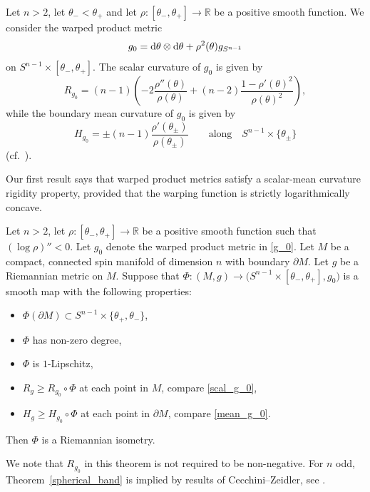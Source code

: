 \documentclass[pdftex]{sigma}
\numberwithin{equation}{section}
\newcommand{\R}{\mathbb{R}}
\begin{document}
Let $n>2$, let $\theta_- < \theta_+$ and let $\rho\colon [\theta_- , \theta_+] \to \R$ be a positive smooth function.
We consider the warped product metric
\begin{equation} \label{g_0}
 g_0 = {\rm d}\theta \otimes {\rm d}\theta + \rho^2(\theta) g_{S^{n-1}}
\end{equation}
on $S^{n-1} \times [\theta_- , \theta_+]$. The scalar curvature of $g_0$ is given by
\begin{equation} \label{scal_g_0}
 R_{g_0} = (n-1) \left( -2 \frac{\rho''(\theta)}{\rho(\theta)} + (n-2) \frac{1- \rho'(\theta)^2}{\rho(\theta)^2} \right),
\end{equation}
while the boundary mean curvature of $g_0$ is given by
\begin{equation} \label{mean_g_0}
 H_{g_0} = \pm (n-1) \frac{\rho'(\theta_{\pm})}{\rho(\theta_{\pm})}\qquad \text{along}\quad S^{n-1} \times \{ \theta_{\pm} \}
\end{equation}
(cf.\ \cite[Example~4.1]{Baer-Gauduchon-Moroianu}).

Our first result says that warped product metrics satisfy a scalar-mean curvature rigidity property, provided that the warping function is strictly logarithmically concave.

\begin{theorem} \label{spherical_band}
Let $n>2$, let $\rho\colon [\theta_- , \theta_+] \to \R$ be a positive smooth function such that ${(\log \rho)''<0}$.
Let $g_0$ denote the warped product metric in \eqref{g_0}.
Let $M$ be a compact, connected spin manifold of dimension $n$ with boundary $\partial M$.
Let $g$ be a Riemannian metric on $M$.
Suppose that $\Phi\colon (M,g) \to \big(S^{n-1} \times [\theta_-,\theta_+],g_0\big)$ is a smooth map with the following properties:
\begin{itemize}\itemsep=0pt
\item $\Phi(\partial M) \subset S^{n-1} \times \{\theta_+,\theta_-\}$,
\item $\Phi$ has non-zero degree,
\item $\Phi$ is $1$-Lipschitz,
\item $R_g \geq R_{g_0} \circ \Phi$ at each point in $M$, compare \eqref{scal_g_0},
\item $H_g \geq H_{g_0} \circ \Phi$ at each point in $\partial M$, compare \eqref{mean_g_0}.
\end{itemize}
Then $\Phi$ is a Riemannian isometry.
\end{theorem}

We note that $R_{g_0}$ in this theorem is not required to be non-negative.
For $n$ odd, Theorem~\ref{spherical_band} is implied by results of Cecchini--Zeidler, see \cite[Theorem~10.2]{Cecchini-Zeidler}.
\end{document}

